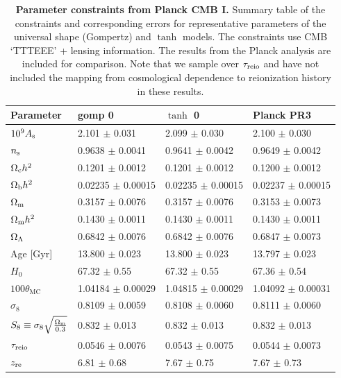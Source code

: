 \begin{table}
\centering
\small
\begin{tabular}{llll}
\toprule
Parameter & gomp 0 & $\tanh$ 0  & Planck PR3 \\
\midrule
$10^{9} A_\mathrm{s}$ & 2.101 $\pm$ 0.031 & 2.099 $\pm$ 0.030 & 2.100 $\pm$ 0.030 \\
$n_\mathrm{s}$ & 0.9638 $\pm$ 0.0041 & 0.9641 $\pm$ 0.0042 & 0.9649 $\pm$ 0.0042 \\
$\Omega_\mathrm{c} h^2$ & 0.1201 $\pm$ 0.0012 & 0.1201 $\pm$ 0.0012 & 0.1200 $\pm$ 0.0012 \\
$\Omega_\mathrm{b} h^2 $ & 0.02235 $\pm$ 0.00015 & 0.02235 $\pm$ 0.00015 & 0.02237 $\pm$ 0.00015 \\
$\Omega_\mathrm{m}$ & 0.3157 $\pm$ 0.0076 & 0.3157 $\pm$ 0.0076 & 0.3153 $\pm$ 0.0073 \\
$\Omega_\mathrm{m} h^2$ & 0.1430 $\pm$ 0.0011 & 0.1430 $\pm$ 0.0011 & 0.1430 $\pm$ 0.0011 \\
$\Omega_\Lambda$ & 0.6842 $\pm$ 0.0076 & 0.6842 $\pm$ 0.0076 & 0.6847 $\pm$ 0.0073 \\
Age [Gyr] & 13.800 $\pm$ 0.023 & 13.800 $\pm$ 0.023 & 13.797 $\pm$ 0.023 \\
$H_0$ & 67.32 $\pm$ 0.55 & 67.32 $\pm$ 0.55 & 67.36 $\pm$ 0.54 \\
$100 \theta_\mathrm{MC}$ & 1.04184 $\pm$ 0.00029 & 1.04815 $\pm$ 0.00029 & 1.04092 $\pm$ 0.00031 \\
$\sigma_8$ & 0.8109 $\pm$ 0.0059 & 0.8108 $\pm$ 0.0060 & 0.8111 $\pm$ 0.0060 \\
$S_8 \equiv \sigma_8 \sqrt{\frac{\Omega_\mathrm{m}}{0.3}}$ & 0.832 $\pm$ 0.013 & 0.832 $\pm$ 0.013 & 0.832 $\pm$ 0.013\\
$\tau_{\mathrm{reio}}$ & 0.0546 $\pm$ 0.0076 & 0.0543 $\pm$ 0.0075 & 0.0544 $\pm$ 0.0073 \\
$z_{\mathrm{re}}$ & 6.81 $\pm$ 0.68 & 7.67 $\pm$ 0.75 & 7.67 $\pm$ 0.73 \\
\bottomrule
\end{tabular}
\caption{\textbf{Parameter constraints from Planck CMB I.}
Summary table of the constraints and corresponding errors for
representative parameters of the universal shape (Gompertz) and $\tanh$
models.
The constraints use CMB `TTTEEE' + lensing information.
The results from the Planck analysis \cite{Planck2020a} are included for
comparison.
Note that we sample over $\tau_{\mathrm{reio}}$ and have not included the mapping
from cosmological dependence to reionization history in these results.}
\label{tab:tau_comp}
\end{table}

